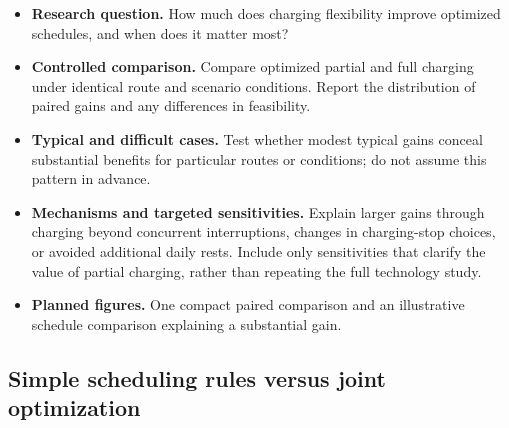 \documentclass[3p,11pt,authoryear]{elsarticle}  %
\begin{document}
{\color{red}
\begin{itemize}
    \item \textbf{Research question.} How much does charging flexibility improve optimized schedules, and when does it matter most?
    \item \textbf{Controlled comparison.} Compare optimized partial and full charging under identical route and scenario conditions. Report the distribution of paired gains and any differences in feasibility.
    \item \textbf{Typical and difficult cases.} Test whether modest typical gains conceal substantial benefits for particular routes or conditions; do not assume this pattern in advance.
    \item \textbf{Mechanisms and targeted sensitivities.} Explain larger gains through charging beyond concurrent interruptions, changes in charging-stop choices, or avoided additional daily rests. Include only sensitivities that clarify the value of partial charging, rather than repeating the full technology study.
    \item \textbf{Planned figures.} One compact paired comparison and an illustrative schedule comparison explaining a substantial gain.
\end{itemize}
}

\subsection{Simple scheduling rules versus joint optimization}
\label{sec:results_simple_rules}
\end{document}
